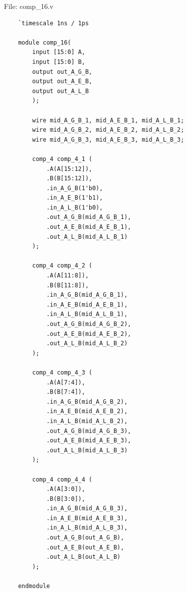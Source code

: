 \documentclass{article}
\begin{document}
File: comp\_16.v
\begin{lstlisting}
    `timescale 1ns / 1ps

    module comp_16(
        input [15:0] A,
        input [15:0] B,
        output out_A_G_B,
        output out_A_E_B,
        output out_A_L_B
        );
    
        wire mid_A_G_B_1, mid_A_E_B_1, mid_A_L_B_1;
        wire mid_A_G_B_2, mid_A_E_B_2, mid_A_L_B_2;
        wire mid_A_G_B_3, mid_A_E_B_3, mid_A_L_B_3;
    
        comp_4 comp_4_1 (
            .A(A[15:12]),
            .B(B[15:12]),
            .in_A_G_B(1'b0),
            .in_A_E_B(1'b1),
            .in_A_L_B(1'b0),
            .out_A_G_B(mid_A_G_B_1),
            .out_A_E_B(mid_A_E_B_1),
            .out_A_L_B(mid_A_L_B_1)
        );
    
        comp_4 comp_4_2 (
            .A(A[11:8]),
            .B(B[11:8]),
            .in_A_G_B(mid_A_G_B_1),
            .in_A_E_B(mid_A_E_B_1),
            .in_A_L_B(mid_A_L_B_1),
            .out_A_G_B(mid_A_G_B_2),
            .out_A_E_B(mid_A_E_B_2),
            .out_A_L_B(mid_A_L_B_2)
        );
    
        comp_4 comp_4_3 (
            .A(A[7:4]),
            .B(B[7:4]),
            .in_A_G_B(mid_A_G_B_2),
            .in_A_E_B(mid_A_E_B_2),
            .in_A_L_B(mid_A_L_B_2),
            .out_A_G_B(mid_A_G_B_3),
            .out_A_E_B(mid_A_E_B_3),
            .out_A_L_B(mid_A_L_B_3)
        );
    
        comp_4 comp_4_4 (
            .A(A[3:0]),
            .B(B[3:0]),
            .in_A_G_B(mid_A_G_B_3),
            .in_A_E_B(mid_A_E_B_3),
            .in_A_L_B(mid_A_L_B_3),
            .out_A_G_B(out_A_G_B),
            .out_A_E_B(out_A_E_B),
            .out_A_L_B(out_A_L_B)
        );
    
    endmodule
\end{lstlisting}
\end{document}
